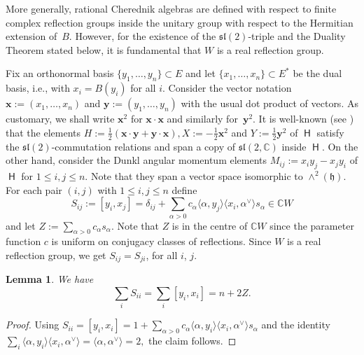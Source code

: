 \documentclass[pdftex]{sigma}
\numberwithin{equation}{section}
\newtheorem{Lemma}[Theorem]{Lemma}
\newcommand{\fh}{\mathfrak{h}}
\newcommand{\fl}{\mathfrak{l}}
\newcommand{\fs}{\mathfrak{s}}
\newcommand{\bbc}{\mathbb{C}}
\newcommand{\bx}{\mathbf{x}}
\newcommand{\by}{\mathbf{y}}
\DeclareMathOperator{\rca}{\mathsf{H}}
\begin{document}
\begin{Remark}
More generally, rational Cherednik algebras are defined with respect to finite complex reflection groups inside the unitary group with respect to the Hermitian extension of~$B$. However, for the existence of the $\mathfrak{sl}(2)$-triple and the Duality Theorem stated below, it is fundamental that $W$ is a real reflection group.
\end{Remark}

Fix an orthonormal basis $\{y_1,\dots, y_n\}\subset E$ and let $\{x_1,\dots,x_n\}\subset E^*$ be the dual basis, i.e., with $x_i = B(y_i)$ for all $i$. Consider the vector notation $\bx:=(x_1,\dots,x_n)$ and $\by := (y_1,\dots,y_n)$ with the usual dot product of vectors. As customary, we shall write $\bx^2$ for $\bx\cdot\bx$ and similarly for~$\by^2$. It is well-known (see \cite{He91}) that the elements $H := \tfrac{1}{2}(\bx\cdot\by + \by\cdot\bx), X:= -\tfrac{1}{2}\bx^2$ and $Y:=\tfrac{1}{2} \by^2$ of $\rca$ satisfy the $\fs\fl(2)$-commutation relations and span a copy of $\fs\fl(2,\bbc)$ inside $\rca$. On the other hand, consider the Dunkl angular momentum elements $M_{ij} := x_iy_j - x_jy_i$ of $\rca$ for $1\leq i,j\leq n$. Note that they span a vector space isomorphic to $\wedge^2(\fh)$. For each pair $(i,j)$ with $1\leq i, j\leq n$ define
\[
S_{ij} := [y_i,x_j] = \delta_{ij} + \sum_{\alpha >0} c_\alpha \langle \alpha,y_j \rangle \langle x_i, \alpha^\vee \rangle s_\alpha\in\bbc W
\]
and let $Z := \sum_{\alpha>0} c_\alpha s_\alpha$. Note that $Z$ is in the centre of $\bbc W$ since the parameter function $c$ is uniform on conjugacy classes of reflections. Since $W$ is a real reflection group, we get $S_{ij}=S_{ji}$, for all $i$, $j$.

\begin{Lemma}
We have
\begin{equation}\label{e:commutatorsum}
 \sum_i S_{ii} = \sum_i [y_i,x_i] = n + 2Z.
\end{equation}
\end{Lemma}

\begin{proof}
Using $S_{ii} = [y_i,x_i] = 1+\sum_{\alpha >0} c_\alpha \langle \alpha ,y_i\rangle \langle x_i,\alpha^\vee \rangle s_\alpha$ and the identity
$
\sum_i \langle \alpha,y_i \rangle \langle x_i,\alpha^\vee \rangle = \langle \alpha, \alpha^\vee\rangle =2,
$
the claim follows.
\end{proof}
\end{document}
